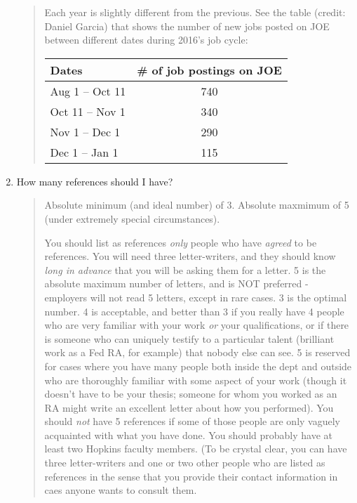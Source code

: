 \documentclass{\classes/econtex}
\providecommand\phantomsection{}
\begin{document}
\begin{enumerate}
  \begin{quote}
    Each year is slightly different from the previous. See the table (credit: Daniel Garcia) 
    that shows the number of new jobs posted on JOE between different dates 
    during 2016's job cycle:
    \ifdvi\phantomsection\hypertarget{JobPostDates}{}\fi
    \begin{table}[h]
      \centering
      \begin{tabular}{|l|c|}
        \hline
        Dates                   & \# of job postings on JOE \\ \hline
        Aug 1 -- Oct 11   & 740                       \\ \hline
        Oct 11 -- Nov 1 & 340                       \\ \hline
        Nov 1 -- Dec 1 & 290                       \\ \hline
        Dec 1 -- Jan 1  & 115                       \\ \hline
      \end{tabular}
    \end{table}
  \end{quote}

\item How many references should I have?

  \begin{quote}
    Absolute minimum (and ideal number) of 3.  Absolute maxmimum of 5 (under
    extremely special circumstances).  

    You should list as references \textit{only} people who have \textit{agreed}
    to be references.  You will need three letter-writers, and they should know \textit{long in advance} that you will be asking them for a letter.  5 is the absolute
    maximum number of letters, and is NOT preferred - employers will not read 5 letters,
    except in rare cases.  3 is the optimal number.  4 is acceptable, and
    better than 3 if you really have 4 people who are very familiar with
    your work \textit{or} your qualifications, or if there is someone who can
    uniquely testify to a particular talent (brilliant work as a Fed RA,
    for example) that nobody else can see.  5 is reserved for cases where
    you have many people both inside the dept and outside who are
    thoroughly familiar with some aspect of your work (though it doesn't
    have to be your thesis; someone for whom you worked as an RA might
    write an excellent letter about how you performed).  You should \textit{not} have 5 references if some of those people are only vaguely
    acquainted with what you have done.  You should probably have at least
    two Hopkins faculty members.  (To be crystal clear, you can have three letter-writers and one or two other people who are listed as references in the sense that you provide their contact information in caes anyone wants to consult them.


\end{quote}
\end{enumerate}
\end{document}
